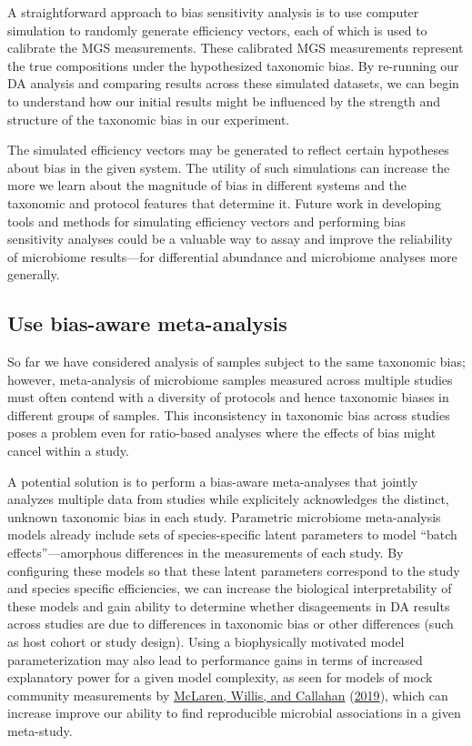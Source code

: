 \documentclass[
]{article}
\theoremstyle{definition}
\theoremstyle{definition}
\theoremstyle{definition}
\theoremstyle{definition}
\theoremstyle{remark}
\begin{document}
A straightforward approach to bias sensitivity analysis is to use computer simulation to randomly generate efficiency vectors, each of which is used to calibrate the MGS measurements.
These calibrated MGS measurements represent the true compositions under the hypothesized taxonomic bias.
By re-running our DA analysis and comparing results across these simulated datasets, we can begin to understand how our initial results might be influenced by the strength and structure of the taxonomic bias in our experiment.

The simulated efficiency vectors may be generated to reflect certain hypotheses about bias in the given system.
The utility of such simulations can increase the more we learn about the magnitude of bias in different systems and the taxonomic and protocol features that determine it.
Future work in developing tools and methods for simulating efficiency vectors and performing bias sensitivity analyses could be a valuable way to assay and improve the reliability of microbiome results---for differential abundance and microbiome analyses more generally.

\hypertarget{use-bias-aware-meta-analysis}{%
\subsection{Use bias-aware meta-analysis}\label{use-bias-aware-meta-analysis}}

So far we have considered analysis of samples subject to the same taxonomic bias;
however, meta-analysis of microbiome samples measured across multiple studies must often contend with a diversity of protocols and hence taxonomic biases in different groups of samples.
This inconsistency in taxonomic bias across studies poses a problem even for ratio-based analyses where the effects of bias might cancel within a study.

A potential solution is to perform a bias-aware meta-analyses that jointly analyzes multiple data from studies while explicitely acknowledges the distinct, unknown taxonomic bias in each study.
Parametric microbiome meta-analysis models already include sets of species-specific latent parameters to model ``batch effects''---amorphous differences in the measurements of each study.
By configuring these models so that these latent parameters correspond to the study and species specific efficiencies, we can increase the biological interpretability of these models and gain ability to determine whether disageements in DA results across studies are due to differences in taxonomic bias or other differences (such as host cohort or study design).
Using a biophysically motivated model parameterization may also lead to performance gains in terms of increased explanatory power for a given model complexity, as seen for models of mock community measurements by \protect\hyperlink{ref-mclaren2019cons}{McLaren, Willis, and Callahan} (\protect\hyperlink{ref-mclaren2019cons}{2019}), which can increase improve our ability to find reproducible microbial associations in a given meta-study.
\end{document}
